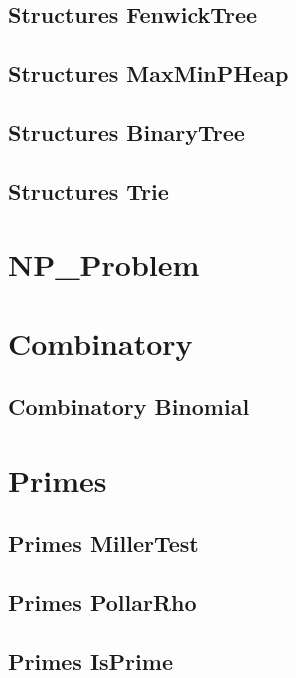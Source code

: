 \subsection{Structures FenwickTree}
\raggedbottom
\hrulefill
\subsection{Structures MaxMinPHeap}
\raggedbottom
\hrulefill
\subsection{Structures BinaryTree}
\raggedbottom
\hrulefill
\subsection{Structures Trie}
\raggedbottom
\hrulefill

\section{NP_Problem}

\section{Combinatory}
\subsection{Combinatory Binomial}
\raggedbottom
\hrulefill

\section{Primes}
\subsection{Primes MillerTest}
\raggedbottom
\hrulefill
\subsection{Primes PollarRho}
\raggedbottom
\hrulefill
\subsection{Primes IsPrime}
\raggedbottom
\hrulefill
